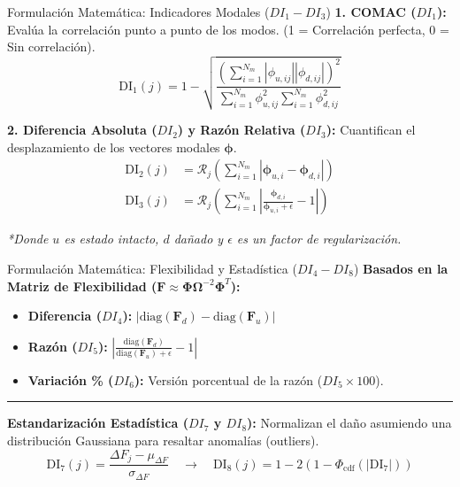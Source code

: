 \documentclass{beamer}
\begin{document}
\begin{frame}{Formulación Matemática: Indicadores Modales ($DI_1 - DI_3$)}
    \small
    \textbf{1. COMAC ($DI_1$):}
    Evalúa la correlación punto a punto de los modos. (1 = Correlación perfecta, 0 = Sin correlación).
    \begin{equation}
        \text{DI}_1(j) = 1 - \sqrt{ \frac{ \left( \sum_{i=1}^{N_m} |\phi_{u,ij}| |\phi_{d,ij}| \right)^2 }{ \sum_{i=1}^{N_m} \phi_{u,ij}^2 \sum_{i=1}^{N_m} \phi_{d,ij}^2 } }
    \end{equation}

    \vspace{0.2cm}

    \textbf{2. Diferencia Absoluta ($DI_2$) y Razón Relativa ($DI_3$):}
    Cuantifican el desplazamiento de los vectores modales $\boldsymbol{\phi}$.
    \begin{align}
        \text{DI}_2(j) &= \mathcal{R}_j \left( \sum_{i=1}^{N_m} | \boldsymbol{\phi}_{u,i} - \boldsymbol{\phi}_{d,i} | \right) \\
        \text{DI}_3(j) &= \mathcal{R}_j \left( \sum_{i=1}^{N_m} \left| \frac{\boldsymbol{\phi}_{d,i}}{\boldsymbol{\phi}_{u,i} + \epsilon} - 1 \right| \right)
    \end{align}

    \footnotesize \textit{*Donde $u$ es estado intacto, $d$ dañado y $\epsilon$ es un factor de regularización.}
\end{frame}

\begin{frame}{Formulación Matemática: Flexibilidad y Estadística ($DI_4 - DI_8$)}
    \small
    \textbf{Basados en la Matriz de Flexibilidad ($\mathbf{F} \approx \boldsymbol{\Phi} \boldsymbol{\Omega}^{-2} \boldsymbol{\Phi}^T$):}
    \begin{itemize}
        \item \textbf{Diferencia ($DI_4$):} $| \text{diag}(\mathbf{F}_d) - \text{diag}(\mathbf{F}_u) |$
        \item \textbf{Razón ($DI_5$):} $\left| \frac{\text{diag}(\mathbf{F}_d)}{\text{diag}(\mathbf{F}_u) + \epsilon} - 1 \right|$
        \item \textbf{Variación \% ($DI_6$):} Versión porcentual de la razón ($DI_5 \times 100$).
    \end{itemize}

    \vspace{0.2cm}
    \hrule
    \vspace{0.2cm}

    \textbf{Estandarización Estadística ($DI_7$ y $DI_8$):}
    Normalizan el daño asumiendo una distribución Gaussiana para resaltar anomalías (outliers).
    \begin{equation}
        \text{DI}_7(j) = \frac{\Delta F_j - \mu_{\Delta F}}{\sigma_{\Delta F}} \quad \rightarrow \quad \text{DI}_8(j) = 1 - 2\left( 1 - \Phi_{\text{cdf}}(|\text{DI}_7|) \right)
    \end{equation}
\end{frame}
\end{document}
